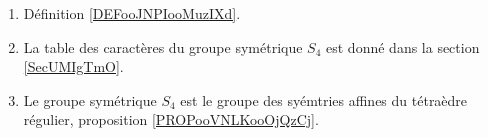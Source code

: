        \label{THEMEooQEEWooXDhvhv}

\begin{enumerate}
    \item
        Définition \ref{DEFooJNPIooMuzIXd}.
    \item
        La table des caractères du groupe symétrique \( S_4\) est donné dans la section \ref{SecUMIgTmO}.
    \item
        Le groupe symétrique \( S_4\) est le groupe des syémtries affines du tétraèdre régulier, proposition \ref{PROPooVNLKooOjQzCj}.
\end{enumerate}
